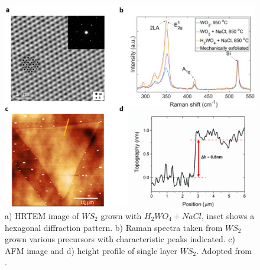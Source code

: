 \begin{figure}[H]
	\begin{center}
		\includegraphics[scale=0.3]{PaperAFM.png}
		\caption{a) HRTEM image of $WS_2$ grown with $H_2WO_4+NaCl$, inset shows a hexagonal diffraction pattern. b) Raman spectra taken from $WS_2$ grown various precursors with characteristic peaks indicated. c) AFM image and d) height profile of single layer $WS_2$. Adopted from \cite{Reale2017}.}
		\label{fig:PaperAFM}
	\end{center}
\end{figure}

